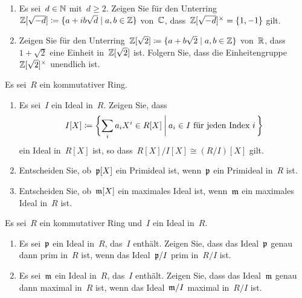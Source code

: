 \documentclass{scrartcl}
\begin{document}
\begin{exercise}
  \leavevmode
  \begin{enumerate}
    \item
      Es sei~$d \in \mathbb{N}$ mit~$d \geq 2$.
      Zeigen Sie für den Unterring~$\Integer[\sqrt{-d}] \defined \{ a + i b \sqrt{d} \suchthat a, b \in \Integer \}$ von~$\mathbb{C}$, dass~$\mathbb{Z}[\sqrt{-d}]^\times = \{1, -1\}$ gilt.
    \item
      Zeigen Sie für den Unterring~$\Integer[\sqrt{2}] \defined \{ a + b \sqrt{2} \suchthat a, b \in \Integer \}$ von~$\mathbb{R}$, dass~$1 + \sqrt{2}$ eine Einheit in~$\mathbb{Z}[\sqrt{2}]$ ist.
      Folgern Sie, dass die Einheitengruppe~$\mathbb{Z}[\sqrt{2}]^\times$ unendlich ist.
  \end{enumerate}
\end{exercise}

\begin{exercise}
  Es sei~$R$ ein kommutativer Ring.
  \begin{enumerate}
    \item
      Es sei~$I$ ein Ideal in~$R$.
      Zeigen Sie, dass
      \[
        I[X]
        \defined
        \biggl\{
          \sum_i a_i X^i \in R[X]
        \suchthat[\bigg]
          \text{$a_i \in I$ für jeden Index~$i$}
          \spacing
        \biggr\}
      \]
      ein Ideal in~$R[X]$ ist, so dass~$R[X] / I[X] \cong (R/I)[X]$ gilt.
    \item
      Entscheiden Sie, ob~$\mathfrak{p}[X]$ ein Primideal ist, wenn~$\mathfrak{p}$ ein Primideal in~$R$ ist.
    \item
      Entscheiden Sie, ob~$\mathfrak{m}[X]$ ein maximales Ideal ist, wenn~$\mathfrak{m}$ ein maximales Ideal in~$R$ ist.
  \end{enumerate}
\end{exercise}

\begin{exercise}
  Es sei~$R$ ein kommutativer Ring und~$I$ ein Ideal in~$R$.
  \begin{enumerate}
    \item
      Es sei~$\mathfrak{p}$ ein Ideal in~$R$, das~$I$ enthält.
      Zeigen Sie, dass das Ideal~$\mathfrak{p}$ genau dann prim in~$R$ ist, wenn das Ideal~$\mathfrak{p}/I$ prim in~$R/I$ ist.
    \item
      Es sei~$\mathfrak{m}$ ein Ideal in~$R$, das~$I$ enthält.
      Zeigen Sie, dass das Ideal~$\mathfrak{m}$ genau dann maximal in~$R$ ist, wenn das Ideal~$\mathfrak{m}/I$ maximal in~$R/I$ ist.
  \end{enumerate}
\end{exercise}
\end{document}
